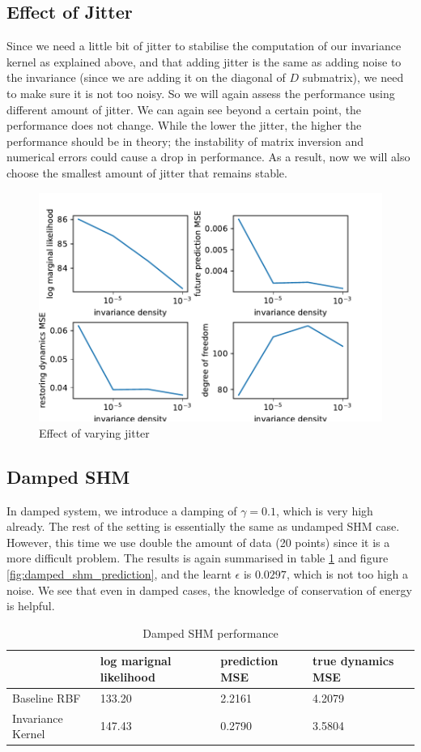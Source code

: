 \documentclass{statsmsc}
\begin{document}
\subsection{Effect of Jitter}
Since we need a little bit of jitter to stabilise the computation of our invariance kernel as explained above, and that adding jitter is the same as adding noise to the invariance (since we are adding it on the diagonal of $D$ submatrix), we need to make sure it is not too noisy. So we will again assess the performance using different amount of jitter.
We can again see beyond a certain point, the performance does not change. 
While the lower the jitter, the higher the performance should be in theory; the instability of matrix inversion and numerical errors could cause a drop in performance.
As a result, now we will also choose the smallest amount of jitter that remains stable.  

\begin{figure}[H] 
  \includegraphics[width=0.6\linewidth]{../codes/figures/vary_jitter_density.pdf}
  \centering
  \caption{Effect of varying jitter}
  \label{fig:vary_jitter}
\end{figure}

\subsection{Damped SHM}
In damped system, we introduce a damping of $\gamma=0.1$, which is very high already.
The rest of the setting is essentially the same as undamped SHM case.
However, this time we use double the amount of data (20 points) since it is a more difficult problem.
The results is again summarised in table \ref{tab:damped_shm_performance} and figure \ref{fig:damped_shm_prediction}, and the learnt $\epsilon$ is $0.0297$, which is not too high a noise.
We see that even in damped cases, the knowledge of conservation of energy is helpful.
\begin{table}[H]
  \centering
  \begin{tabular}{l l l l}
    \hline
                    & log marignal likelihood & prediction MSE  & true dynamics MSE\\
    \hline
Baseline RBF & 133.20 & 2.2161 & 4.2079 \\
Invariance Kernel & 147.43 & 0.2790 & 3.5804 \\
    \hline
  \end{tabular}
  \caption{Damped SHM performance }
  \label{tab:damped_shm_performance}
\end{table}
\end{document}
